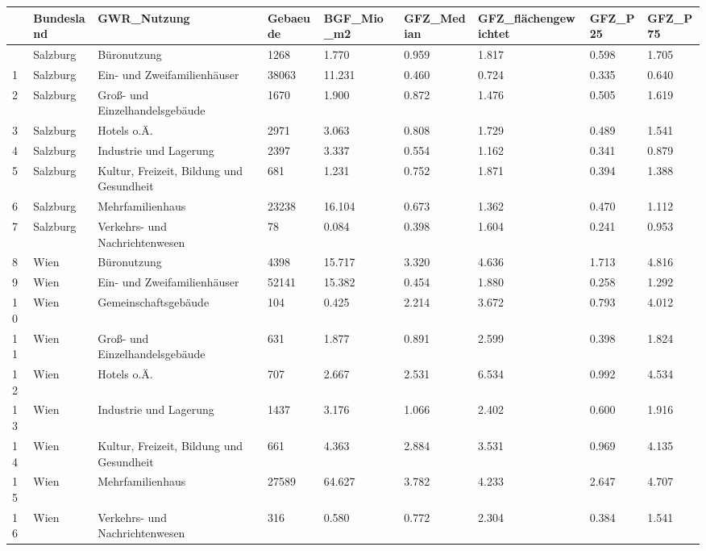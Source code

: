 \documentclass[
  ngerman,
  a4paper,
  DIV=11]{scrreprt}
\newcounter{none} %
\begin{document}
{\def\LTcaptype{none} %
\begin{longtable}[]{@{}lllllllll@{}}
\toprule\noalign{}
& Bundesland & GWR\_Nutzung & Gebaeude & BGF\_Mio\_m2 & GFZ\_Median &
GFZ\_flächengewichtet & GFZ\_P25 & GFZ\_P75 \\
\midrule\noalign{}
\endhead
\bottomrule\noalign{}
\endlastfoot
0 & Salzburg & Büronutzung & 1268 & 1.770 & 0.959 & 1.817 & 0.598 &
1.705 \\
1 & Salzburg & Ein- und Zweifamilienhäuser & 38063 & 11.231 & 0.460 &
0.724 & 0.335 & 0.640 \\
2 & Salzburg & Groß- und Einzelhandelsgebäude & 1670 & 1.900 & 0.872 &
1.476 & 0.505 & 1.619 \\
3 & Salzburg & Hotels o.Ä. & 2971 & 3.063 & 0.808 & 1.729 & 0.489 &
1.541 \\
4 & Salzburg & Industrie und Lagerung & 2397 & 3.337 & 0.554 & 1.162 &
0.341 & 0.879 \\
5 & Salzburg & Kultur, Freizeit, Bildung und Gesundheit & 681 & 1.231 &
0.752 & 1.871 & 0.394 & 1.388 \\
6 & Salzburg & Mehrfamilienhaus & 23238 & 16.104 & 0.673 & 1.362 & 0.470
& 1.112 \\
7 & Salzburg & Verkehrs- und Nachrichtenwesen & 78 & 0.084 & 0.398 &
1.604 & 0.241 & 0.953 \\
8 & Wien & Büronutzung & 4398 & 15.717 & 3.320 & 4.636 & 1.713 &
4.816 \\
9 & Wien & Ein- und Zweifamilienhäuser & 52141 & 15.382 & 0.454 & 1.880
& 0.258 & 1.292 \\
10 & Wien & Gemeinschaftsgebäude & 104 & 0.425 & 2.214 & 3.672 & 0.793 &
4.012 \\
11 & Wien & Groß- und Einzelhandelsgebäude & 631 & 1.877 & 0.891 & 2.599
& 0.398 & 1.824 \\
12 & Wien & Hotels o.Ä. & 707 & 2.667 & 2.531 & 6.534 & 0.992 & 4.534 \\
13 & Wien & Industrie und Lagerung & 1437 & 3.176 & 1.066 & 2.402 &
0.600 & 1.916 \\
14 & Wien & Kultur, Freizeit, Bildung und Gesundheit & 661 & 4.363 &
2.884 & 3.531 & 0.969 & 4.135 \\
15 & Wien & Mehrfamilienhaus & 27589 & 64.627 & 3.782 & 4.233 & 2.647 &
4.707 \\
16 & Wien & Verkehrs- und Nachrichtenwesen & 316 & 0.580 & 0.772 & 2.304
& 0.384 & 1.541 \\
\end{longtable}
}
\end{document}
